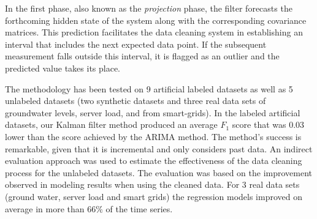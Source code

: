 In the first phase, also known as the \textit{projection} phase, the filter forecasts the forthcoming hidden state of the system along with the corresponding covariance matrices. 
This prediction facilitates the data cleaning system in establishing an interval that includes the next expected data point.
If the subsequent measurement falls outside this interval, it is flagged as an outlier and the predicted value takes its place.

The methodology has been tested on 9 artificial labeled datasets as well as 5 unlabeled datasets (two synthetic datasets and three real data sets of groundwater levels, server load, and from smart-grids).
In the labeled artificial datasets, our Kalman filter method produced an average $F_1$ score that was $0.03$ lower than the score achieved by the ARIMA method.
The method's success is remarkable, given that it is incremental and only considers past data.
An indirect evaluation approach was used to estimate the effectiveness of the data cleaning process for the unlabeled datasets.
The evaluation was based on the improvement observed in modeling results when using the cleaned data.
For 3 real data sets (ground water, server load and smart grids) the regression models improved on average in more than $66\%$ of the time series.

